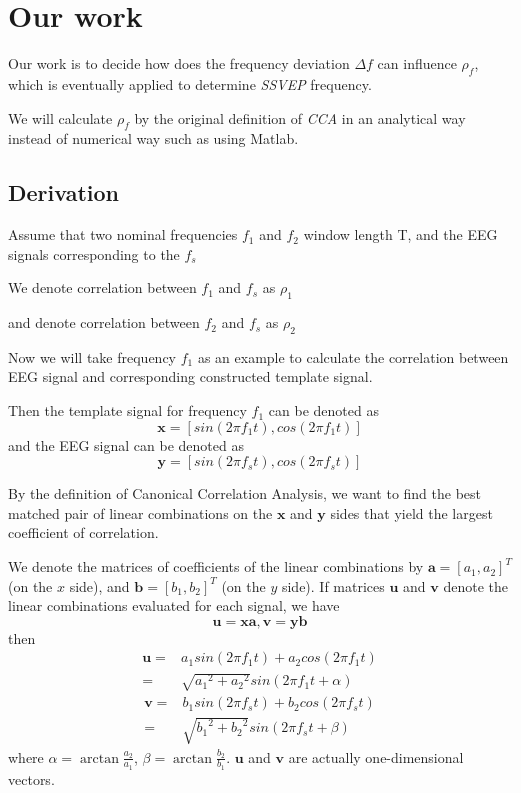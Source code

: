 \documentclass{article}
\begin{document}
\section{Our work}

Our work is to decide how does the frequency deviation $\Delta f$ can influence $\rho_{f}$, which is eventually applied to determine \emph{SSVEP} frequency.

We will calculate $\rho_{f}$ by the original definition of \emph{CCA} in an analytical way instead of numerical way such as using Matlab.

\subsection{Derivation}

Assume that two nominal frequencies $f_1$ and $f_2$ window length T, and the EEG signals corresponding to the $f_s$

We denote correlation between $f_1$ and $f_s$ as $\rho_{1}$

and denote correlation between $f_2$ and $f_s$ as $\rho_{2}$

Now we will take frequency $f_1$ as an example to calculate the correlation between EEG signal and corresponding constructed template signal.

Then the template signal for frequency $f_1$ can be denoted as
$$\mathbf{x} = [sin(2\pi f_1t), cos(2\pi f_1t)]$$
and the EEG signal can be denoted as
$$\mathbf{y} = [sin(2\pi f_st), cos(2\pi f_st)]$$

By the definition of Canonical Correlation Analysis, we want to find the best matched pair of linear combinations on the $\mathbf{x}$ and $\mathbf{y}$ sides that yield the largest coefficient of correlation.

We denote the matrices of coefficients of the linear combinations by $\mathbf{a} = {[a_{1}, a_{2}]}^{T}$ (on the $x$ side), and $\mathbf{b} = {[b_{1}, b_{2}]}^{T}$ (on the $y$ side). If matrices $\mathbf{u}$ and $\mathbf{v}$ denote the linear combinations evaluated for each signal, we have
$$\mathbf{u} = \mathbf{xa},\mathbf{v} = \mathbf{yb}$$
then
\begin{align}
\mathbf{u}  =& a_{1}sin(2\pi f_1t) + a_{2}cos(2\pi f_1t) \nonumber  \\
            =& \sqrt{{a_{1}}^{2} + {a_{2}}^{2}}sin(2\pi f_1t + \alpha)
\end{align}
\begin{align}
\mathbf{v}  =& b_{1}sin(2\pi f_st) + b_{2}cos(2\pi f_st) \nonumber  \\
            =& \sqrt{{b_{1}}^{2} + {b_{2}}^{2}}sin(2\pi f_st + \beta)
\end{align}
where $\alpha = \arctan{\frac {a_2} {a_1}}$, $\beta = \arctan{\frac {b_2} {b_1}}$.
$\mathbf{u}$ and $\mathbf{v}$ are actually one-dimensional vectors.
\end{document}
